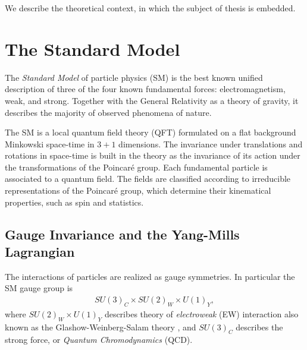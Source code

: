

We describe the theoretical context, in which the subject of thesis is embedded.



\section{The Standard Model}

The \emph{Standard Model} of particle physics (SM) is the best known unified description of three of the
four known fundamental forces: electromagnetism, weak, and strong.
Together with the General Relativity as a theory of gravity,
it describes the majority of observed phenomena of nature.

The SM is a local quantum field theory (QFT) formulated on a flat background Minkowski space-time in $3+1$ dimensions.
The invariance under translations and rotations in space-time is built in the theory as the
invariance of its action under the transformations of the Poincaré group.
Each fundamental particle is associated to a quantum field.
The fields are classified according to irreducible representations of the Poincaré group,
which determine their kinematical properties, such as spin and statistics.

\subsection{Gauge Invariance and the Yang-Mills Lagrangian}
\label{sec:giym}

The interactions of particles are realized as gauge symmetries.
In particular the SM gauge group is
\begin{align}\label{eq:SMgauge}
  SU(3)_C\times SU(2)_W \times U(1)_Y,
\end{align}
where $SU(2)_W \times U(1)_Y$ describes theory of \emph{electroweak} (EW)
interaction also known as the Glashow-Weinberg-Salam theory \cite{Glashow1961a,Weinberg1967a,Salam1968,Glashow1970},
and $SU(3)_C$ describes the strong force, or \emph{Quantum Chromodynamics} (QCD).


